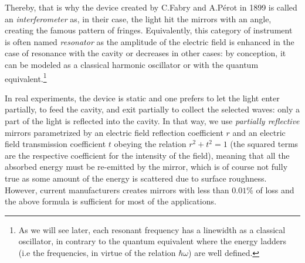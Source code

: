 \documentclass[11pt]{report}
\begin{document}
Thereby, that is why the device created by C.Fabry and A.Pérot in 1899 is called an \textit{interferometer} as, in their case, the light hit the mirrors with an angle, creating the famous pattern of fringes. Equivalently, this category of instrument is often named \textit{resonator} as the amplitude of the electric field is enhanced in the case of resonance with the cavity or decreases in other cases: by conception, it can be modeled as a classical harmonic oscillator or with the quantum equivalent.\footnote{As we will see later, each resonant frequency has a linewidth as a classical oscillator, in contrary to the quantum equivalent where the energy ladders (i.e the frequencies, in virtue of the relation $ \hbar \omega$) are well defined.}

In real experiments, the device is static and one prefers to let the light enter partially, to feed the cavity, and exit partially to collect the selected waves: only a part of the light is reflected into the cavity. In that way, we use \textit{partially reflective} mirrors parametrized by an electric field reflection coefficient $r$ and an electric field transmission coefficient $t$ obeying the relation $r^2 + t^2 = 1$ (the squared terms are the respective coefficient for the intensity of the field), meaning that all the absorbed energy must be re-emitted by the mirror, which is of course not fully true as some amount of the energy is scattered due to surface roughness. However, current manufacturers creates mirrors with less than $0.01\%$ of loss and the above formula is sufficient for most of the applications.
\end{document}
